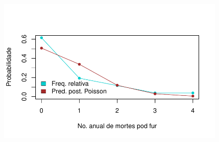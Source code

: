 \documentclass[
  letterpaper,
  DIV=11,
  numbers=noendperiod]{scrreprt}
\theoremstyle{definition}
\theoremstyle{definition}
\theoremstyle{remark}
\begin{document}
\begin{figure}[H]

{\centering \includegraphics{misturas_files/figure-pdf/unnamed-chunk-2-1.pdf}

}

\end{figure}
\end{document}
